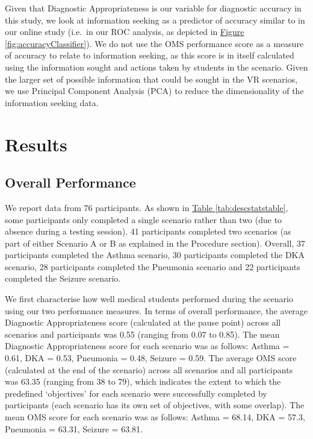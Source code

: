 \documentclass[a4paper, nobind]{templates/ociamthesis}
\begin{document}
\hfill\break
Given that Diagnostic Appropriateness is our variable for diagnostic accuracy in this study, we look at information seeking as a predictor of accuracy similar to in our online study (i.e.~in our ROC analysis, as depicted in \hyperref[fig:accuracyClassifier]{Figure \ref{fig:accuracyClassifier}}). We do not use the OMS performance score as a measure of accuracy to relate to information seeking, as this score is in itself calculated using the information sought and actions taken by students in the scenario. Given the larger set of possible information that could be sought in the VR scenarios, we use Principal Component Analysis (PCA) to reduce the dimensionality of the information seeking data.

\section{Results}\label{results-3}

\subsection{Overall Performance}\label{overall-performance}

We report data from 76 participants. As shown in \hyperref[tab:descstatstable]{Table \ref{tab:descstatstable}}, some participants only completed a single scenario rather than two (due to absence during a testing session). 41 participants completed two scenarios (as part of either Scenario A or B as explained in the Procedure section). Overall, 37 participants completed the Asthma scenario, 30 participants completed the DKA scenario, 28 participants completed the Pneumonia scenario and 22 participants completed the Seizure scenario.

\hfill\break
We first characterise how well medical students performed during the scenario using our two performance measures. In terms of overall performance, the average Diagnostic Appropriateness score (calculated at the pause point) across all scenarios and participants was 0.55 (ranging from 0.07 to 0.85). The mean Diagnostic Appropriateness score for each scenario was as follows: Asthma = 0.61, DKA = 0.53, Pneumonia = 0.48, Seizure = 0.59. The average OMS score (calculated at the end of the scenario) across all scenarios and all participants was 63.35 (ranging from 38 to 79), which indicates the extent to which the predefined `objectives' for each scenario were successfully completed by participants (each scenario has its own set of objectives, with some overlap). The mean OMS score for each scenario was as follows: Asthma = 68.14, DKA = 57.3, Pneumonia = 63.31, Seizure = 63.81.
\end{document}
